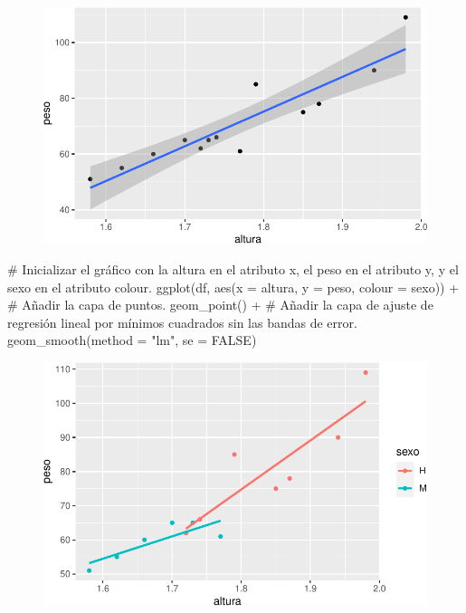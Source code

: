 \documentclass[
  a4paper,
]{scrreport}
\newenvironment{Shaded}{\begin{snugshade}}{\end{snugshade}}
\newcommand{\AttributeTok}[1]{\textcolor[rgb]{0.40,0.45,0.13}{#1}}
\newcommand{\CommentTok}[1]{\textcolor[rgb]{0.37,0.37,0.37}{#1}}
\newcommand{\ConstantTok}[1]{\textcolor[rgb]{0.56,0.35,0.01}{#1}}
\newcommand{\FunctionTok}[1]{\textcolor[rgb]{0.28,0.35,0.67}{#1}}
\newcommand{\NormalTok}[1]{\textcolor[rgb]{0.00,0.23,0.31}{#1}}
\newcommand{\SpecialCharTok}[1]{\textcolor[rgb]{0.37,0.37,0.37}{#1}}
\newcommand{\StringTok}[1]{\textcolor[rgb]{0.13,0.47,0.30}{#1}}
\theoremstyle{definition}
\theoremstyle{definition}
\theoremstyle{remark}
\begin{document}
\begin{figure}[H]

{\centering \includegraphics{./07-graficos_files/figure-pdf/unnamed-chunk-25-1.pdf}

}

\end{figure}

\begin{Shaded}
\begin{Highlighting}[]
\CommentTok{\# Inicializar el gráfico con la altura en el atributo x, el peso en el atributo y, y el sexo en el atributo colour.}
\FunctionTok{ggplot}\NormalTok{(df, }\FunctionTok{aes}\NormalTok{(}\AttributeTok{x =}\NormalTok{ altura, }\AttributeTok{y =}\NormalTok{ peso, }\AttributeTok{colour =}\NormalTok{ sexo)) }\SpecialCharTok{+}
\CommentTok{\# Añadir la capa de puntos.}
    \FunctionTok{geom\_point}\NormalTok{() }\SpecialCharTok{+}
\CommentTok{\# Añadir la capa de ajuste de regresión lineal por mínimos cuadrados sin las bandas de error.}
    \FunctionTok{geom\_smooth}\NormalTok{(}\AttributeTok{method =} \StringTok{"lm"}\NormalTok{, }\AttributeTok{se =} \ConstantTok{FALSE}\NormalTok{)}
\end{Highlighting}
\end{Shaded}

\begin{figure}[H]

{\centering \includegraphics{./07-graficos_files/figure-pdf/unnamed-chunk-26-1.pdf}

}

\end{figure}
\end{document}
